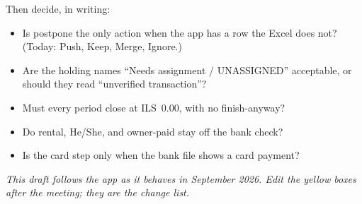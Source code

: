 \documentclass[11pt,a4paper]{article}
\begin{document}
Then decide, in writing:

\begin{itemize}
  \item Is postpone the only action when the app has a row the Excel does
        not? (Today: Push, Keep, Merge, Ignore.)
  \item Are the holding names ``Needs assignment / UNASSIGNED'' acceptable,
        or should they read ``unverified transaction''?
  \item Must every period close at ILS~0.00, with no finish-anyway?
  \item Do rental, He/She, and owner-paid stay off the bank check?
  \item Is the card step only when the bank file shows a card payment?
\end{itemize}

\vspace{1.2em}
\noindent\textit{This draft follows the app as it behaves in September 2026.
Edit the yellow boxes after the meeting; they are the change list.}
\end{document}
